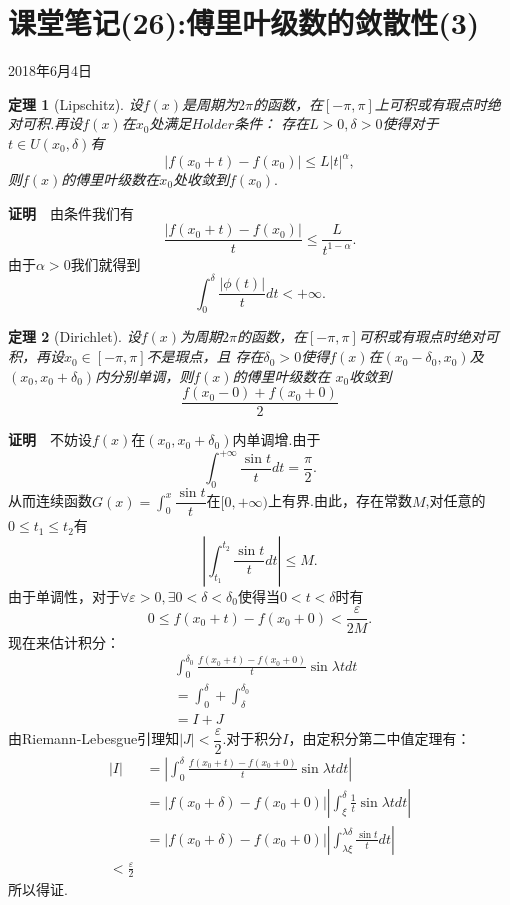 \documentclass[UTF8]{article}
\newcommand{\zm}{\textbf{证明}$\quad$}
\newtheorem{thm}{\hspace{2em}定理}[section]
\begin{document}
  \section{课堂笔记(26):傅里叶级数的敛散性(3)}
  \begin{center}
    2018年6月4日
  \end{center}
  \begin{thm}[Lipschitz]
    设$f(x)$是周期为$2\pi$的函数，在$[-\pi,\pi]$上可积或有瑕点时绝对可积.再设$f(x)$在$x_0$处满足$Holder$条件：
    存在$L>0,\delta>0$使得对于$t\in U(x_0,\delta)$有
    $$|f(x_0+t)-f(x_0)|\le L|t|^\alpha,$$
    则$f(x)$的傅里叶级数在$x_0$处收敛到$f(x_0).$
  \end{thm}
  \zm 由条件我们有
  $$\frac{|f(x_0+t)-f(x_0)|}{t}\le\frac{L}{t^{1-\alpha}}.$$
  由于$\alpha>0$我们就得到
  $$\int_0^\delta\frac{|\phi(t)|}{t}dt<+\infty.$$
  \begin{thm}[Dirichlet]
    设$f(x)$为周期$2\pi$的函数，在$[-\pi,\pi]$可积或有瑕点时绝对可积，再设$x_0\in[-\pi,\pi]$不是瑕点，且
    存在$\delta_0>0$使得$f(x)$在$(x_0-\delta_0,x_0)$及$(x_0,x_0+\delta_0)$内分别单调，则$f(x)$的傅里叶级数在
    $x_0$收敛到
    $$\frac{f(x_0-0)+f(x_0+0)}{2}$$
  \end{thm}
  \zm 不妨设$f(x)$在$(x_0,x_0+\delta_0)$内单调增.由于
  $$\int_0^{+\infty}\frac{\sin t}{t}dt=\frac{\pi}{2}.$$
  从而连续函数$G(x)=\displaystyle\int_0^x\dfrac{\sin t}{t}$在$[0,+\infty)$上有界.由此，存在常数$M$,对任意的
  $0\le t_1\le t_2$有
  $$\left|\int_{t_1}^{t_2}\frac{\sin t}{t}dt\right|\le M.$$
  由于单调性，对于$\forall \varepsilon>0,\exists 0<\delta<\delta_0$使得当$0<t<\delta$时有
  $$0\le f(x_0+t)-f(x_0+0)<\frac{\varepsilon}{2M}.$$
  现在来估计积分：
  \begin{align*}
    &\int_0^{\delta_0}\frac{f(x_0+t)-f(x_0+0)}{t}\sin \lambda tdt\\
    &=\int_0^\delta+\int_\delta^{\delta_0}\\
    &=I+J
  \end{align*}
  由Riemann-Lebesgue引理知$|J|<\dfrac{\varepsilon}{2}.$对于积分$I$，由定积分第二中值定理有：
  \begin{align*}
    |I|&=\left|\int_0^\delta \frac{f(x_0+t)-f(x_0+0)}{t}\sin \lambda tdt\right|\\
    &=|f(x_0+\delta)-f(x_0+0)|\left|\int_\xi^\delta\frac{1}{t}\sin\lambda tdt\right|\\
    &=|f(x_0+\delta)-f(x_0+0)|\left|\int_{\lambda\xi}^{\lambda\delta}\frac{\sin t}{t}dt\right|\\
    <\frac{\varepsilon}{2}
  \end{align*}
  所以得证.
\end{document}

